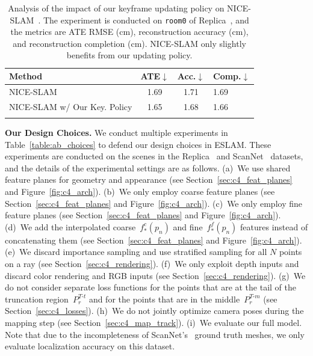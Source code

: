 \begin{table}[t]
    \begin{center}
        \begin{tabular}{l|ccl}
            \Xhline{2\arrayrulewidth}
            Method & ATE$\downarrow$ & Acc.$\downarrow$ & Comp.$\downarrow$ \\

            \hline
            NICE-SLAM~\citep{zhu2022nice} & 1.69 & 1.71 & 1.69 \\
            NICE-SLAM w/ Our Key. Policy & 1.65 & 1.68 & 1.66 \\

            \Xhline{2\arrayrulewidth}
        \end{tabular}
    \end{center}
    \caption{Analysis of the impact of our keyframe updating policy on NICE-SLAM~\citep{zhu2022nice}. The experiment is conducted on \texttt{room0} of Replica~\citep{replica19arxiv}, and the metrics are ATE RMSE (cm), reconstruction accuracy (cm), and reconstruction completion (cm). NICE-SLAM only slightly benefits from our updating policy.}
    \label{table:ab_key}
\end{table}

\vspace{1ex}
\noindent\textbf{Our Design Choices.} We conduct multiple experiments in Table~\ref{table:ab_choices} to defend our design choices in ESLAM. These experiments are conducted on the scenes in the Replica~\citep{replica19arxiv} and ScanNet~\citep{dai2017scannet} datasets, and the details of the experimental settings are as follows. (a)~We use shared feature planes for geometry and appearance (see Section~\ref{sec:c4_feat_planes} and Figure~\ref{fig:c4_arch}). (b)~We only employ coarse feature planes (see Section~\ref{sec:c4_feat_planes} and Figure~\ref{fig:c4_arch}). (c)~We only employ fine feature planes (see Section~\ref{sec:c4_feat_planes} and Figure~\ref{fig:c4_arch}). (d)~We add the interpolated coarse~$f^{c}_{*}(p_{n})$ and fine~$f^{f}_{*}(p_{n})$ features instead of concatenating them (see Section~\ref{sec:c4_feat_planes} and Figure~\ref{fig:c4_arch}). (e)~We discard importance sampling and use stratified sampling for all $N$ points on a ray (see Section~\ref{sec:c4_rendering}). (f)~We only exploit depth inputs and discard color rendering and RGB inputs (see Section~\ref{sec:c4_rendering}). (g)~We do not consider separate loss functions for the points that are at the tail of the truncation region~$P_{r}^{T\text{-}t}$ and for the points that are in the middle~$P_{r}^{T\text{-}m}$ (see Section~\ref{sec:c4_losses}). (h)~We do not jointly optimize camera poses during the mapping step (see Section~\ref{sec:c4_map_track}). (i)~We evaluate our full model. Note that due to the incompleteness of ScanNet's~\citep{dai2017scannet} ground truth meshes, we only evaluate localization accuracy on this dataset.


